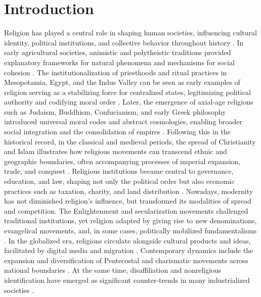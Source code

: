 \documentclass[11pt,a4paper]{article}
\begin{document}
\section{Introduction}
\label{sec:introduction}
Religion has played a central role in shaping human societies, influencing cultural identity, political institutions, and collective behavior throughout history \cite{intro_1,intro_2,intro_3}. In early agricultural societies, animistic and polytheistic traditions provided explanatory frameworks for natural phenomena and mechanisms for social cohesion \cite{intro_4,intro_5,intro_6}. The institutionalization of priesthoods and ritual practices in Mesopotamia, Egypt, and the Indus Valley can be seen as early examples of religion serving as a stabilizing force for centralized states, legitimizing political authority and codifying moral order \cite{intro_7,intro_8,intro_9}. Later, the emergence of axial-age religions such as Judaism, Buddhism, Confucianism, and early Greek philosophy introduced universal moral codes and abstract cosmologies, enabling broader social integration and the consolidation of empires \cite{intro_10,intro_11,intro_12}. Following this in the historical record, in the classical and medieval periods, the spread of Christianity and Islam illustrates how religious movements can transcend ethnic and geographic boundaries, often accompanying processes of imperial expansion, trade, and conquest \cite{intro_13,intro_14,intro_15}. Religious institutions became central to governance, education, and law, shaping not only the political order but also economic practices such as taxation, charity, and land distribution \cite{intro_16,intro_17}. Nowadays, modernity has not diminished religion's influence, but transformed its modalities of spread and competition. The Enlightenment and secularization movements challenged traditional institutions, yet religion adapted by giving rise to new denominations, evangelical movements, and, in some cases, politically mobilized fundamentalisms \cite{intro_18,intro_19,intro_20}. In the globalized era, religions circulate alongside cultural products and ideas, facilitated by digital media and migration \cite{intro_21,intro_22}. Contemporary dynamics include the expansion and diversification of Pentecostal and charismatic movements across national boundaries \cite{intro_23,intro_24,intro_25}. At the same time, disaffiliation and nonreligious identification have emerged as significant counter-trends in many industrialized societies \cite{intro_26}.
\end{document}
